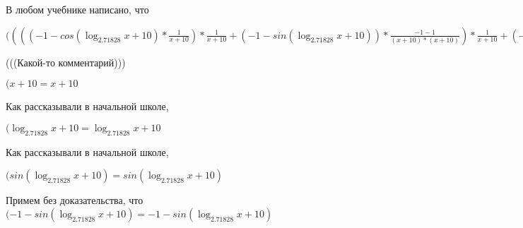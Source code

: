 \documentclass[12pt,a4paper,fleqn]{article}
\theoremstyle{definition}
\begin{document}
В любом учебнике написано, что

$(((( -1  - cos(\log_{ 2.71828 }{ x  +  10 }) * \frac{ 1 }{ x  +  10 }
) * \frac{ 1 }{ x  +  10 }
 + ( -1  - sin(\log_{ 2.71828 }{ x  +  10 })) * \frac{ -1  -  1 }{( x  +  10 ) * ( x  +  10 )}
) * \frac{ 1 }{ x  +  10 }
 + ( -1  - sin(\log_{ 2.71828 }{ x  +  10 })) * \frac{ 1 }{ x  +  10 }
 * \frac{ -1  -  1 }{( x  +  10 ) * ( x  +  10 )}
 + ( -1  - sin(\log_{ 2.71828 }{ x  +  10 })) * \frac{ 1 }{ x  +  10 }
 * \frac{ -2 }{( x  +  10 ) * ( x  +  10 )}
 + cos(\log_{ 2.71828 }{ x  +  10 }) * \frac{ -1  -  -2  * ( x  +  10  +  x  +  10 )}{( x  +  10 ) * ( x  +  10 ) * ( x  +  10 ) * ( x  +  10 )}
) * { 3 }^{sin(\log_{ 2.71828 }{ x  +  10 })} + (( -1  - sin(\log_{ 2.71828 }{ x  +  10 })) * \frac{ 1 }{ x  +  10 }
 * \frac{ 1 }{ x  +  10 }
 + cos(\log_{ 2.71828 }{ x  +  10 }) * \frac{ -2 }{( x  +  10 ) * ( x  +  10 )}
) * cos(\log_{ 2.71828 }{ x  +  10 }) * \frac{ 1 }{ x  +  10 }
 * { 3 }^{sin(\log_{ 2.71828 }{ x  +  10 })} = ((( -1  - cos(\log_{ 2.71828 }{ x  +  10 }) * \frac{ 1 }{ x  +  10 }
) * \frac{ 1 }{ x  +  10 }
 + ( -1  - sin(\log_{ 2.71828 }{ x  +  10 })) * \frac{ -1  -  1 }{( x  +  10 ) * ( x  +  10 )}
) * \frac{ 1 }{ x  +  10 }
 + ( -1  - sin(\log_{ 2.71828 }{ x  +  10 })) * \frac{ 1 }{ x  +  10 }
 * \frac{ -1  -  1 }{( x  +  10 ) * ( x  +  10 )}
 + ( -1  - sin(\log_{ 2.71828 }{ x  +  10 })) * \frac{ 1 }{ x  +  10 }
 * \frac{ -2 }{( x  +  10 ) * ( x  +  10 )}
 + cos(\log_{ 2.71828 }{ x  +  10 }) * \frac{ -1  -  -2  * ( x  +  10  +  x  +  10 )}{( x  +  10 ) * ( x  +  10 ) * ( x  +  10 ) * ( x  +  10 )}
) * { 3 }^{sin(\log_{ 2.71828 }{ x  +  10 })} + (( -1  - sin(\log_{ 2.71828 }{ x  +  10 })) * \frac{ 1 }{ x  +  10 }
 * \frac{ 1 }{ x  +  10 }
 + cos(\log_{ 2.71828 }{ x  +  10 }) * \frac{ -2 }{( x  +  10 ) * ( x  +  10 )}
) * cos(\log_{ 2.71828 }{ x  +  10 }) * \frac{ 1 }{ x  +  10 }
 * { 3 }^{sin(\log_{ 2.71828 }{ x  +  10 })}$

(((Какой-то комментарий)))

$( x  +  10  =  x  +  10 $

Как рассказывали в начальной школе,

$(\log_{ 2.71828 }{ x  +  10 } = \log_{ 2.71828 }{ x  +  10 }$

Как рассказывали в начальной школе,

$(sin(\log_{ 2.71828 }{ x  +  10 }) = sin(\log_{ 2.71828 }{ x  +  10 })$

Примем без доказательства, что
$( -1  - sin(\log_{ 2.71828 }{ x  +  10 }) =  -1  - sin(\log_{ 2.71828 }{ x  +  10 })$
\end{document}

